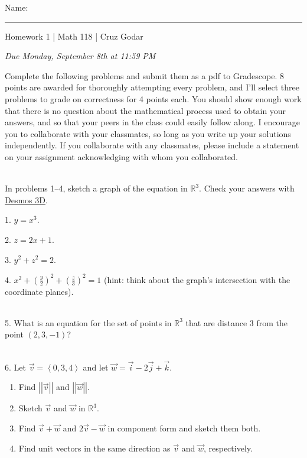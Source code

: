 \documentclass{article}
\begin{document}
\Large Name: \rule{2in}{0.15mm} \hfill Homework 1 | Math 118 | Cruz Godar \vspace{4pt} \normalsize

\textit{Due Monday, September 8th at 11:59 PM}

Complete the following problems and submit them as a pdf to Gradescope. 8 points are awarded for thoroughly attempting every problem, and I'll select three problems to grade on correctness for 4 points each. You should show enough work that there is no question about the mathematical process used to obtain your answers, and so that your peers in the class could easily follow along. I encourage you to collaborate with your classmates, so long as you write up your solutions independently. If you collaborate with any classmates, please include a statement on your assignment acknowledging with whom you collaborated.

~\\

In problems 1--4, sketch a graph of the equation in $\mathbb{R}^3$. Check your answers with \href{https://www.desmos.com/3d}{Desmos 3D}.

1. $\displaystyle y = x^3$.

2. $\displaystyle z = 2x + 1$.

3. $\displaystyle y^2 + z^2 = 2$.

4. $\displaystyle x^2 + \left( \frac{y}{2} \right)^2 + \left( \frac{z}{3} \right)^2 = 1$ (hint: think about the graph's intersection with the coordinate planes).

~\\

5. What is an equation for the set of points in $\mathbb{R}^3$ that are distance $3$ from the point $(2, 3, -1)$?

~\\

6. Let $\vec{v} = \left< 0, 3, 4 \right>$ and let $\vec{w} = \vec{i} - 2\vec{j} + \vec{k}$.

\begin{enumerate}

	\item Find $\left| \left| \vec{v} \right| \right|$ and $\left| \left| \vec{w} \right| \right|$.

	\item Sketch $\vec{v}$ and $\vec{w}$ in $\mathbb{R}^3$.

	\item Find $\vec{v} + \vec{w}$ and $2\vec{v} - \vec{w}$ in component form and sketch them both.

	\item Find unit vectors in the same direction as $\vec{v}$ and $\vec{w}$, respectively.

\end{enumerate}
\end{document}
